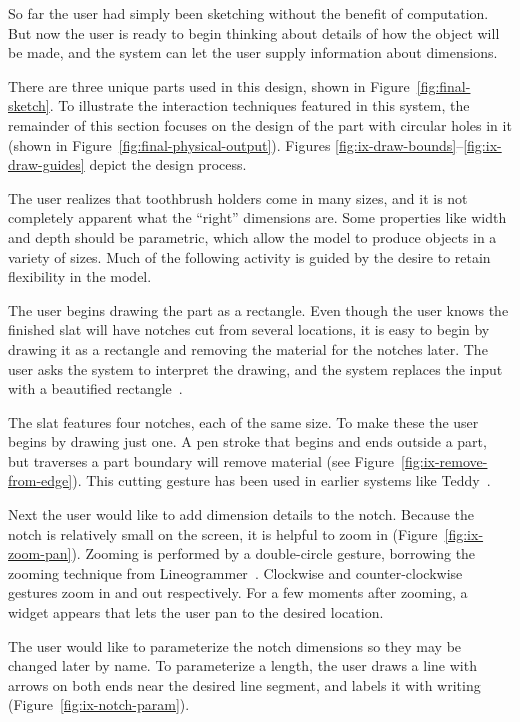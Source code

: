 \documentclass[12pt]{article}
\begin{document}
So far the user had simply been sketching without the benefit of
computation. But now the user is ready to begin thinking about details
of how the object will be made, and the system can let the user supply
information about dimensions.

There are three unique parts used in this design, shown in
Figure~\ref{fig:final-sketch}. To illustrate the interaction
techniques featured in this system, the remainder of this section
focuses on the design of the part with circular holes in it (shown in
Figure~\ref{fig:final-physical-output}). Figures
\ref{fig:ix-draw-bounds}--\ref{fig:ix-draw-guides} depict the design
process.

The user realizes that toothbrush holders come in many sizes, and it
is not completely apparent what the ``right'' dimensions are. Some
properties like width and depth should be parametric, which allow the
model to produce objects in a variety of sizes. Much of the following
activity is guided by the desire to retain flexibility in the model.

The user begins drawing the part as a rectangle. Even though the user
knows the finished slat will have notches cut from several locations,
it is easy to begin by drawing it as a rectangle and removing the
material for the notches later. The user asks the system to interpret
the drawing, and the system replaces the input with a beautified
rectangle~\cite{pavlidis-beautifier}.

The slat features four notches, each of the same size. To make these
the user begins by drawing just one. A pen stroke that begins and ends
outside a part, but traverses a part boundary will remove material
(see Figure~\ref{fig:ix-remove-from-edge}). This cutting gesture has
been used in earlier systems like Teddy~\cite{igarashi-teddy}.

Next the user would like to add dimension details to the
notch. Because the notch is relatively small on the screen, it is
helpful to zoom in (Figure~\ref{fig:ix-zoom-pan}). Zooming is
performed by a double-circle gesture, borrowing the zooming
technique from Lineogrammer~\cite{zeleznik-lineogrammer}. Clockwise
and counter-clockwise gestures zoom in and out respectively. For a few
moments after zooming, a widget appears that lets the user pan to the
desired location.

The user would like to parameterize the notch dimensions so they may be
changed later by name. To parameterize a length, the user draws a line
with arrows on both ends near the desired line segment, and labels it
with writing (Figure~\ref{fig:ix-notch-param}).
\end{document}
